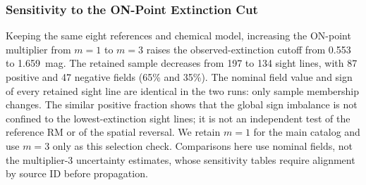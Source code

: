 \documentclass[twocolumn]{aastex701}
\begin{document}
\subsubsection{Sensitivity to the ON-Point Extinction Cut}
\label{sec:on-cut}

Keeping the same eight references and chemical model, increasing the
ON-point multiplier from $m=1$ to $m=3$ raises the observed-extinction cutoff
from 0.553 to 1.659~mag. The retained sample decreases from 197 to 134
sight lines, with 87 positive and 47 negative fields (65\% and 35\%).
The nominal field value and sign of every retained sight line are identical
in the two runs: only sample membership changes. The similar positive
fraction shows that the global sign imbalance is not confined to the
lowest-extinction sight lines; it is not an independent test of the
reference RM or of the spatial reversal. We retain $m=1$ for the main
catalog and use $m=3$ only as this selection check. Comparisons here use
nominal fields, not the multiplier-3 uncertainty estimates, whose
sensitivity tables require alignment by source ID before propagation.




\end{document}
